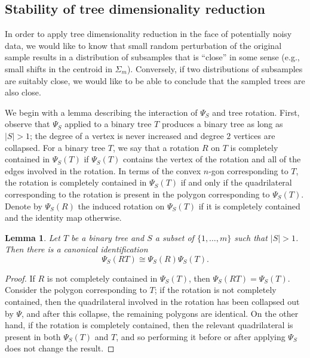 \documentclass[a4paper,11pt]{article}
\newtheorem{lemma}[theorem]{Lemma}
\begin{document}
\subsection{Stability of tree dimensionality reduction}

In order to apply tree dimensionality reduction in the face of potentially noisy data, we would like to know that small random perturbation of the original sample results in a distribution of subsamples that is ``close'' in some sense (e.g., small shifts in the centroid in $\Sigma_m$).
Conversely, if two distributions of subsamples are suitably close, we would like to be able to conclude that the sampled trees are also close.

We begin with a lemma describing the interaction of $\Psi_S$ and tree rotation.
First, observe that $\Psi_S$ applied to a binary tree $T$ produces a binary tree as long as $|S| > 1$; the degree of a vertex is never increased and degree $2$ vertices are collapsed.
For a binary tree $T$, we say that a rotation $R$ on $T$ is completely contained in $\Psi_S(T)$ if $\Psi_S(T)$ contains the vertex of the rotation and all of the edges involved in the rotation.
In terms of the convex $n$-gon corresponding to $T$, the rotation is completely contained in $\Psi_S(T)$ if and only if the quadrilateral corresponding to the rotation is present in the polygon corresponding to $\Psi_S(T)$.
Denote by $\Psi_S(R)$ the induced rotation on $\Psi_S(T)$ if it is completely contained and the identity map otherwise.

\begin{lemma}\label{lem:rotprojcom}
Let $T$ be a binary tree and $S$ a subset of $\{1,\ldots,m\}$ such that $|S| > 1$.
Then there is a canonical identification
\[
\Psi_S(RT) \cong \Psi_S(R) \Psi_S(T).
\]
\end{lemma}

\begin{proof}
If $R$ is not completely contained in $\Psi_S(T)$, then $\Psi_S(RT) = \Psi_S(T)$.
Consider the polygon corresponding to $T$; if the rotation is not completely contained, then the quadrilateral involved in the rotation has been collapsed out by $\Psi$, and after this collapse, the remaining polygons are identical.
On the other hand, if the rotation is completely contained, then the relevant quadrilateral is present in both $\Psi_S(T)$ and $T$, and so performing it before or after applying $\Psi_S$ does not change the result.
\end{proof}
\end{document}

